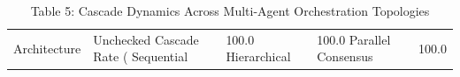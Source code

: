 \begin{table}
\caption{Table 5: Cascade Dynamics Across Multi-Agent Orchestration Topologies}
\label{tab:table5_architecture_comparison}
\begin{tabular}{lllll}
\toprule
Architecture & Unchecked Cascade Rate (%
\midrule
Sequential & 100.0%
Hierarchical & 100.0%
Parallel Consensus & 100.0%
\bottomrule
\end{tabular}
\end{table}
